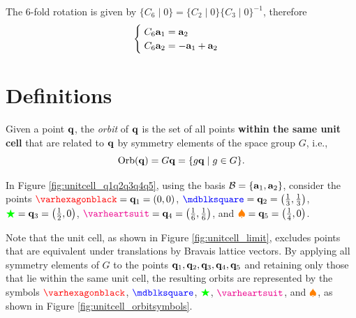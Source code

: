 The 6-fold rotation is given by $\{C_6 \mid 0\} = \{C_2 \mid 0\} \{C_3 \mid 0\}^{-1}$, therefore
\begin{equation} \label{eq:C6_rotation_P6mm}
\begin{cases}
\; C_6 {\vb{a}}_1 = {\vb{a}}_2 \\
\; C_6 {\vb{a}}_2 = -{\vb{a}}_1 + {\vb{a}}_2
\end{cases}
\end{equation}

\section{Definitions}


\begin{definition} \label{def:orbit_q}
Given a point \({\vb{q}}\), the \textit{orbit} of \({\vb{q}}\) is the set of all points \textbf{within the same unit cell} that are related to \({\vb{q}}\) by symmetry elements of the space group \(G\), i.e.,
\begin{equation} \label{eq:orbit_of_q}
\text{Orb}({\vb{q}}) = G {\vb{q}} = \{g {\vb{q}} \mid g \in G\}.
\end{equation}
\end{definition}

\begin{example} \label{ex:orbit_1a2b3c}
In Figure \ref{fig:unitcell_q1q2q3q4q5}, using the basis $\mathcal{B} = \{{\vb{a}}_1, {\vb{a}}_2\}$, consider the points \(\textcolor{red}{\varhexagonblack} = \q_1 = (0,0)\), \(\textcolor{blue}{\mdblksquare} = \q_2 = \qty(\frac{1}{3}, \frac{1}{3})\), \(\textcolor{green}{\bigstar} = {\vb{q}}_3 = \qty(\frac{1}{2}, 0)\), \(\textcolor{magenta}{\varheartsuit} = \q_4 = \qty(\frac{1}{6}, \frac{1}{6})\), and \(\textcolor{orange}{\spadesuit} = {\vb{q}}_5 = \qty(\frac{1}{4}, 0)\).

Note that the unit cell, as shown in Figure \ref{fig:unitcell_limit}, excludes points that are equivalent under translations by Bravais lattice vectors. By applying all symmetry elements of \(G\) to the points \({\vb{q}}_1, {\vb{q}}_2, {\vb{q}}_3, {\vb{q}}_4, {\vb{q}}_5\) and retaining only those that lie within the same unit cell, the resulting orbits are represented by the symbols \(\textcolor{red}{\varhexagonblack}\), \(\textcolor{blue}{\mdblksquare}\), \(\textcolor{green}{\bigstar}\), \(\textcolor{magenta}{\varheartsuit}\), and \(\textcolor{orange}{\spadesuit}\), as shown in Figure \ref{fig:unitcell_orbitsymbols}.
\end{example}

